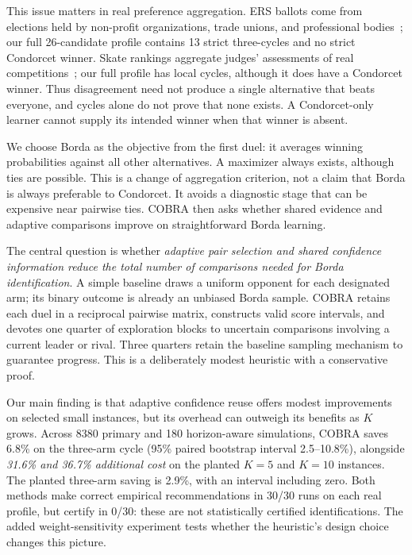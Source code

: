 \documentclass[11pt,a4paper]{article}
\begin{document}
This issue matters in real preference aggregation. ERS ballots come from elections held by non-profit organizations, trade unions, and professional bodies~\cite{ers}; our full 26-candidate profile contains 13 strict three-cycles and no strict Condorcet winner. Skate rankings aggregate judges' assessments of real competitions~\cite{skate}; our full profile has local cycles, although it does have a Condorcet winner. Thus disagreement need not produce a single alternative that beats everyone, and cycles alone do not prove that none exists. A Condorcet-only learner cannot supply its intended winner when that winner is absent.

We choose Borda as the objective from the first duel: it averages winning probabilities against all other alternatives. A maximizer always exists, although ties are possible. This is a change of aggregation criterion, not a claim that Borda is always preferable to Condorcet. It avoids a diagnostic stage that can be expensive near pairwise ties. COBRA then asks whether shared evidence and adaptive comparisons improve on straightforward Borda learning.

The central question is whether \emph{adaptive pair selection and shared confidence information reduce the total number of comparisons needed for Borda identification}. A simple baseline draws a uniform opponent for each designated arm; its binary outcome is already an unbiased Borda sample. COBRA retains each duel in a reciprocal pairwise matrix, constructs valid score intervals, and devotes one quarter of exploration blocks to uncertain comparisons involving a current leader or rival. Three quarters retain the baseline sampling mechanism to guarantee progress. This is a deliberately modest heuristic with a conservative proof.

Our main finding is that adaptive confidence reuse offers modest improvements on selected small instances, but its overhead can outweigh its benefits as $K$ grows. Across 8380 primary and 180 horizon-aware simulations, COBRA saves 6.8\% on the three-arm cycle (95\% paired bootstrap interval 2.5--10.8\%), alongside \emph{31.6\% and 36.7\% additional cost} on the planted $K=5$ and $K=10$ instances. The planted three-arm saving is 2.9\%, with an interval including zero. Both methods make correct empirical recommendations in 30/30 runs on each real profile, but certify in 0/30: these are not statistically certified identifications. The added weight-sensitivity experiment tests whether the heuristic's design choice changes this picture.
\end{document}
